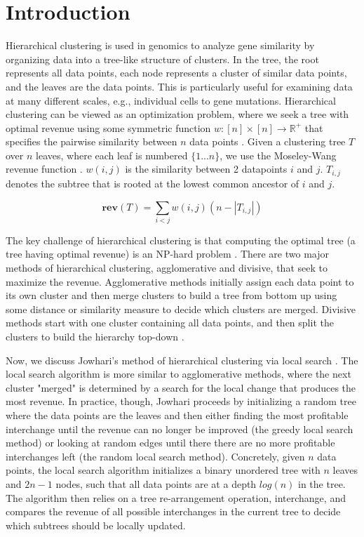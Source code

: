 \documentclass[unnumsec,webpdf,contemporary,large,numbered]{oup-authoring-template}%
\theoremstyle{thmstyleone}%
\theoremstyle{thmstyletwo}%
\theoremstyle{thmstylethree}%
\begin{document}
\section{Introduction}
Hierarchical clustering is used in genomics to analyze gene similarity by organizing data into a tree-like structure of clusters. In the tree, the root represents all data points, each node represents a cluster of similar data points, and the leaves are the data points. This is particularly useful for examining data at many different scales, e.g., individual cells to gene mutations. Hierarchical clustering can be viewed as an optimization problem, where we seek a tree with optimal revenue using some symmetric function $w : [n] \times[n] \rightarrow \mathbb{R}^{+}$ that specifies the pairwise similarity between $n$ data points \cite{jowhari2024hierarchicalclusteringlocalsearch}. Given a clustering tree $T$ over $n$ leaves, where each leaf is numbered $\{1...n\}$, we use the Moseley-Wang revenue function \cite{10.5555/3648699.3648700}. $w(i,j)$ is the similarity between 2 datapoints $i$ and $j$. $T_{i,j}$ denotes the subtree that is rooted at the lowest common ancestor of $i$ and $j$.

\[ \textbf{rev}(T) = \sum_{i<j}{}{w(i,j)(n-|T_{i,j}|)} \]

The key challenge of hierarchical clustering is that computing the optimal tree (a tree having optimal revenue) is an NP-hard problem \cite{10.1145/2897518.2897527}. There are two major methods of hierarchical clustering, agglomerative and divisive, that seek to maximize the revenue. Agglomerative methods initially assign each data point to its own cluster and then merge clusters to build a tree from bottom up using some distance or similarity measure to decide which clusters are merged. Divisive methods start with one cluster containing all data points, and then split the clusters to build the hierarchy top-down \cite{jowhari2024hierarchicalclusteringlocalsearch}.

Now, we discuss Jowhari's method of hierarchical clustering via local search \cite{jowhari2024hierarchicalclusteringlocalsearch}. The local search algorithm is more similar to agglomerative methods, where the next cluster "merged" is determined by a search for the local change that produces the most revenue. In practice, though, Jowhari proceeds by initializing a random tree where the data points are the leaves and then either finding the most profitable interchange until the revenue can no longer be improved (the greedy local search method) or looking at random edges until there there are no more profitable interchanges left (the random local search method). Concretely, given $n$ data points, the local search algorithm initializes a binary unordered tree with $n$ leaves and $2n-1$ nodes, such that all data points are at a depth $log(n)$ in the tree. The algorithm then relies on a tree re-arrangement operation, interchange, and compares the revenue of all possible interchanges in the current tree to decide which subtrees should be locally updated.
\end{document}

